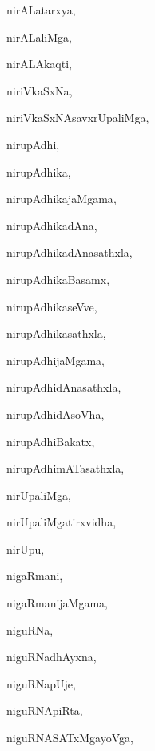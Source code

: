 \begin{multicols}{3}
{\noindent
{nirALatarxya}, \pageref{nirALatarxya}

\noindent
{nirALaliMga}, \pageref{nirALaliMga}

\noindent
{nirALAkaqti}, \pageref{nirALAkaqti}

\noindent
{niriVkaSxNa}, \pageref{niriVkaSxNa}

\noindent
{niriVkaSxNAsavxrUpaliMga}, \pageref{niriVkaSxNAsavxrUpaliMga}

\noindent
{nirupAdhi}, \pageref{nirupAdhi}

\noindent
{nirupAdhika}, \pageref{nirupAdhika}

\noindent
{nirupAdhikajaMgama}, \pageref{nirupAdhikajaMgama}

\noindent
{nirupAdhikadAna}, \pageref{nirupAdhikadAna}

\noindent
{nirupAdhikadAnasathxla}, \pageref{nirupAdhikadAnasathxla}

\noindent
{nirupAdhikaBasamx}, \pageref{nirupAdhikaBasamx}

\noindent
{nirupAdhikaseVve}, \pageref{nirupAdhikaseVve}

\noindent
{nirupAdhikasathxla}, \pageref{nirupAdhikasathxla}

\noindent
{nirupAdhijaMgama}, \pageref{nirupAdhijaMgama}

\noindent
{nirupAdhidAnasathxla}, \pageref{nirupAdhidAnasathxla}

\noindent
{nirupAdhidAsoVha}, \pageref{nirupAdhidAsoVha}

\noindent
{nirupAdhiBakatx}, \pageref{nirupAdhiBakatx}

\noindent
{nirupAdhimATasathxla}, \pageref{nirupAdhimATasathxla}

\noindent
{nirUpaliMga}, \pageref{nirUpaliMga}

\noindent
{nirUpaliMgatirxvidha}, \pageref{nirUpaliMgatirxvidha}

\noindent
{nirUpu}, \pageref{nirUpu}

\noindent
{nigaRmani}, \pageref{nigaRmani}

\noindent
{nigaRmanijaMgama}, \pageref{nigaRmanijaMgama}

\noindent
{niguRNa}, \pageref{niguRNa}

\noindent
{niguRNadhAyxna}, \pageref{niguRNadhAyxna}

\noindent
{niguRNapUje}, \pageref{niguRNapUje}

\noindent
{niguRNApiRta}, \pageref{niguRNApiRta}

\noindent
{niguRNASATxMgayoVga}, \pageref{niguRNASATxMgayoVga}

}
\end{multicols}
